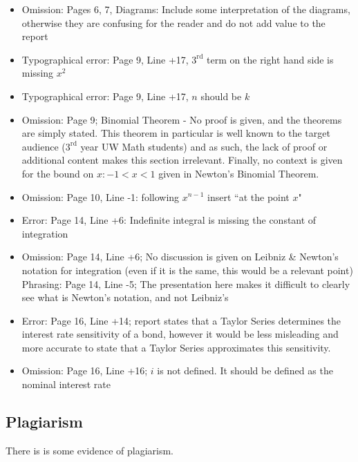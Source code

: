 \documentclass[11pt]{article}
\begin{document}
\begin{itemize}
\item Omission: Pages 6, 7, Diagrams: Include some interpretation of the diagrams, otherwise they are confusing for the reader and do not add value to the report
\item Typographical error: Page 9, Line +17, $3^{\text{rd}}$ term on the right hand side is missing $x^2$
\item Typographical error: Page 9, Line +17, $n$ should be $k$
\item Omission: Page 9; Binomial Theorem - No proof is given, and the theorems are simply stated. This theorem in particular is well known to the target audience ($3^{\text{rd}}$ year UW Math students) and as such, the lack of proof or additional content makes this section irrelevant. Finally, no context is given for the bound on $x: -1 < x < 1$ given in Newton's Binomial Theorem.
\item Omission: Page 10, Line -1: following $x^{n-1}$ insert ``at the point $x$"
\item Error: Page 14, Line +6: Indefinite integral is missing the constant of integration
\item Omission: Page 14, Line +6; No discussion is given on Leibniz \& Newton's notation for integration (even if it is the same, this would be a relevant point)
Phrasing: Page 14, Line -5; The presentation here makes it difficult to clearly see what is Newton's notation, and not Leibniz's 
\item Error: Page 16, Line +14; report states that a Taylor Series determines the interest rate sensitivity of a bond, however it would be less misleading and more accurate to state that a Taylor Series approximates this sensitivity.
\item Omission: Page 16, Line +16; $i$ is not defined. It should be defined as the nominal interest rate
\end{itemize}

\subsection*{Plagiarism}

There is is some evidence of plagiarism.
\end{document}
